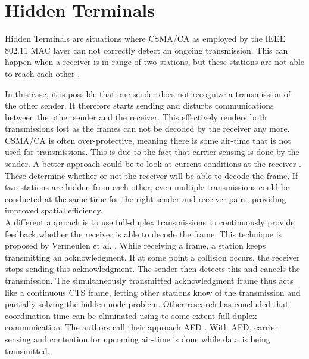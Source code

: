 
\section{Hidden Terminals}

Hidden Terminals are situations where \gls{CSMA/CA} as employed by the IEEE 802.11 \gls{MAC} layer can not correctly detect an ongoing transmission. This can happen when a receiver is in range of two stations, but these stations are not able to reach each other \cite{perahia2013}.

In this case, it is possible that one sender does not recognize a transmission of the other sender. It therefore starts sending and disturbs communications between the other sender and the receiver. This effectively renders both transmissions lost as the frames can not be decoded by the receiver any more.\\

\gls{CSMA/CA} is often over-protective, meaning there is some air-time that is not used for transmissions. This is due to the fact that carrier sensing is done by the sender. A better approach could be to look at current conditions at the receiver \cite{halperin2007}. These determine whether or not the receiver will be able to decode the frame. If two stations are hidden from each other, even multiple transmissions could be conducted at the same time for the right sender and receiver pairs, providing improved spatial efficiency.\\

A different approach is to use full-duplex transmissions to continuously provide feedback whether the receiver is able to decode the frame. This technique is proposed by Vermeulen et al. \cite{vermeulen2016}. While receiving a frame, a station keeps transmitting an acknowledgment. If at some point a collision occurs, the receiver stops sending this acknowledgment. The sender then detects this and cancels the transmission. The simultaneously transmitted acknowledgment frame thus acts like a continuous CTS frame, letting other stations know of the transmission and partially solving the hidden node problem. Other research has concluded that coordination time can be eliminated using to some extent full-duplex communication. The authors call their approach \gls{AFD} \cite{lv2014}. With \gls{AFD}, carrier sensing and contention for upcoming air-time is done while data is being transmitted.

